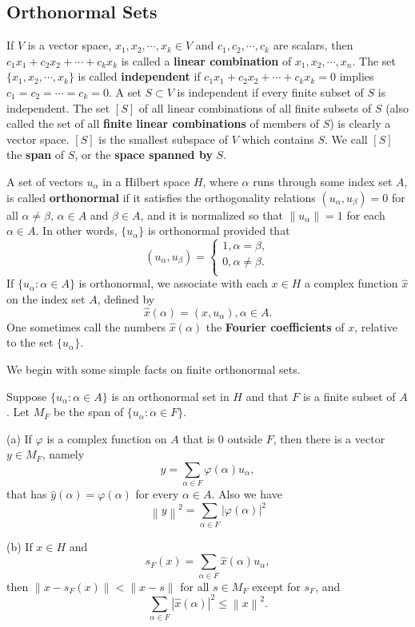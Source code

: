 \subsection{Orthonormal Sets}
If $V$ is a vector space, $x_1,x_2,\cdots,x_k\in V$ and $c_1,c_2,\cdots,c_k$ are scalars, then $c_1x_1+c_2x_2+\cdots+c_kx_k$ is called a \textbf{linear combination} of $x_1,x_2,\cdots,x_n$. The set $\{x_1,x_2,\cdots,x_k\}$ is called \textbf{independent} if $c_1x_1+c_2x_2+\cdots+c_kx_k=0$ implies $c_1=c_2=\cdots=c_k=0$. A set $S\subset V$ is independent if every finite subset of $S$ is independent. The set $[S]$ of all linear combinations of all finite subsets of $S$ (also called the set of all \textbf{finite linear combinations} of members of $S$) is clearly a vector space. $[S]$ is the smallest subspace of $V$ which contains $S$. We call $[S]$ the \textbf{span} of $S$, or the \textbf{space spanned by} $S$.\par
A set of vectors $u_\alpha$ in a Hilbert space $H$, where $\alpha$ runs through some index set $A$, is called \textbf{orthonormal} if it satisfies the orthogonality relations $(u_\alpha,u_\beta)=0$ for all $\alpha\ne\beta$, $\alpha\in A$ and $\beta\in A$, and it is normalized so that $\|u_\alpha\|=1$ for each $\alpha\in A$. In other words, $\{u_\alpha\}$ is orthonormal provided that 
$$
\left( u_{\alpha},u_{\beta} \right) =\begin{cases}
	1,\alpha =\beta ,\\
	0,\alpha \ne \beta .\\
\end{cases}
$$
If $\{u_\alpha:\alpha\in A\}$ is orthonormal, we associate with each $x\in H$ a complex function $\widehat{x}$ on the index set $A$, defined by 
$$
\widehat{x}\left( \alpha \right) =\left( x,u_{\alpha} \right) ,\alpha \in A.
$$
One sometimes call the numbers $\widehat{x}(\alpha)$ the \textbf{Fourier coefficients} of $x$, relative to the set $\{u_\alpha\}$.\par
We begin with some simple facts on finite orthonormal sets.
\begin{theorem}
Suppose $\{u_\alpha:\alpha\in A\}$ is an orthonormal set in $H$ and that $F$ is a finite subset of $A$. Let $M_F$ be the span of $\{u_\alpha:\alpha\in F\}$.\par
(a) If $\varphi$ is a complex function on $A$ that is $0$ outside $F$, then there is a vector $y\in M_F$, namely 
$$y=\sum_{\alpha\in F}\varphi(\alpha)u_\alpha,$$
that has $\widehat{y}(\alpha)=\varphi(\alpha)$ for every $\alpha\in A$. Also we have 
$$
\left\| y \right\| ^2=\sum_{\alpha \in F}{\left| \varphi \left( \alpha \right) \right|^2}
$$\par
(b) If $x\in H$ and 
$$s_F(x)=\sum_{\alpha\in F}\widehat{x}(\alpha)u_\alpha,$$
then $\|x-s_F(x)\|<\|x-s\|$ for all $s\in M_F$ except for $s_F$, and 
$$
\sum_{\alpha \in F}{\left| \widehat{x}\left( \alpha \right) \right|^2}\le \left\| x \right\| ^2.
$$
\end{theorem}
